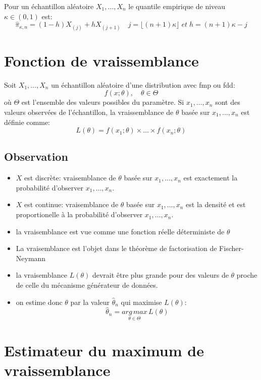 \documentclass[]{book}
\providecommand{\tightlist}{%
  \setlength{\itemsep}{0pt}\setlength{\parskip}{0pt}}
\theoremstyle{definition}
\theoremstyle{definition}
\theoremstyle{definition}
\theoremstyle{remark}
\begin{document}
Pour un échantillon aléatoire \(X_1,\dots,X_n\) le quantile empirique de
niveau \(\kappa\in(0,1)\) est: \[
\hat{\pi}_{\kappa,n}=(1-h)X_{(j)}+hX_{(j+1)}\quad j=\lfloor(n+1)\kappa\rfloor\;et \; h=(n+1)\kappa-j 
\]

\section{Fonction de vraissemblance}\label{fonction-de-vraissemblance}

Soit \(X_1,\dots,X_n\) un échantillon aléatoire d'une distribution avec
fmp ou fdd: \[
f(x;\theta),\quad \theta \in \Theta
\] où \(\Theta\) est l'ensemble des valeurs possibles du paramètre. Si
\(x_1,\dots,x_n\) sont des valeurs observées de l'échantillon, la
vraissemblance de \(\theta\) basée sur \(x_1,\dots,x_n\) est définie
comme: \[
L(\theta)=f(x_1;\theta)\times\dots\times f(x_n;\theta)
\]

\subsection{Observation}\label{observation}

\begin{itemize}
\tightlist
\item
  \(X\) est discrète: vraisemblance de \(\theta\) basée sur
  \(x_1,\dots,x_n\) est exactement la probabilité d'observer
  \(x_1,\dots,x_n\).
\item
  \(X\) est continue: vraisemblance de \(\theta\) basée sur
  \(x_1,\dots,x_n\) est la densité et est proportionelle à la
  probabilité d'observer \(x_1,\dots,x_n\).
\item
  la vraisemblance est vue comme une fonction réelle déterministe de
  \(\theta\)
\item
  La vraisemblance est l'objet dans le théorème de factorisation de
  Fischer-Neymann
\item
  la vraisemblance \(L(\theta)\) devrait être plus grande pour des
  valeurs de \(\theta\) proche de celle du mécanisme générateur de
  données.
\item
  on estime donc \(\theta\) par la valeur \(\hat{\theta}_n\) qui
  maximise \(L(\theta)\): \[
  \hat{\theta}_n=\underset{\theta\in\Theta}{arg\,max}\,L(\theta) 
  \]
\end{itemize}

\section{Estimateur du maximum de
vraissemblance}\label{estimateur-du-maximum-de-vraissemblance}
\end{document}
